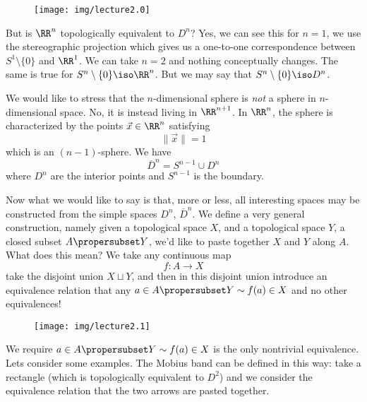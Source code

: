 \begin{wrapfigure}{r}{2in}
  \vspace{-30pt}
  \begin{center}
    \texttt{[image: img/lecture2.0]}
  \end{center}
  \vspace{-20pt}
\end{wrapfigure}
But is $\RR^{n}$ topologically equivalent to $D^{n}$? Yes, we can
see this for $n=1$, we use the stereographic
projection which
gives us a one-to-one correspondence between
$S^{1}\setminus\{0\}$ and $\RR^{1}$. We can take $n=2$ and
nothing conceptually changes. The same is true for
$S^{n}\setminus\{0\}\iso\RR^{n}$. But we may say that
$S^{n}\setminus\{0\}\iso D^{n}$.

We would like to stress that the $n$-dimensional sphere is
\emph{not} a sphere in $n$-dimensional space. No, it is instead
living in $\RR^{n+1}$. In $\RR^{n}$, the sphere is characterized
by the points $\vec{x}\in\RR^{n}$ satisfying
\begin{equation}
\|\vec{x}\|=1
\end{equation}
which is an $(n-1)$-sphere. We have 
\begin{equation}
\overline{D}^{n}=S^{n-1}\cup D^{n}
\end{equation}
where $D^{n}$ are the interior points and $S^{n-1}$ is the boundary.

Now what we would like to say is that, more or less, all
interesting spaces may be constructed from the simple spaces
$D^{n}$, $\overline{D}^{n}$. We define a very general
construction, namely given a topological space $X$, and a
topological space $Y$, a closed subset $A\propersubset Y$, we'd
like to paste together $X$ and $Y$ along $A$. What does this
mean? We take any continuous map
\begin{equation}
f\colon A\to X
\end{equation}
take the disjoint union $X\sqcup Y$, and then in this disjoint
union introduce an equivalence relation that any $a\in
A\propersubset Y \sim f(a)\in X$ and no other equivalences!

\begin{wrapfigure}{l}{0.5in}
  \vspace{-10pt}
  \begin{center}
    \texttt{[image: img/lecture2.1]}
  \end{center}
  \vspace{-20pt}
\end{wrapfigure}
\noindent{}We require $a\in A\propersubset Y\sim f(a)\in X$ is the only
nontrivial equivalence. Lets consider some examples. The Mobius
band can be defined in this way: take a rectangle (which is
topologically equivalent to $D^{2}$) and we consider the
equivalence relation that the two arrows are pasted together.

